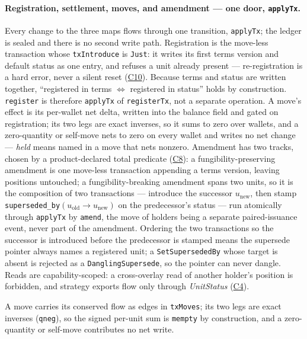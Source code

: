 \paragraph{Registration, settlement, moves, and amendment --- one door, \texttt{applyTx}.}
Every change to the three maps flows through one transition, \texttt{applyTx}; the ledger is
sealed and there is no second write path. Registration is the move-less transaction whose
\texttt{txIntroduce} is \texttt{Just}: it writes its first terms version and default status
as one entry, and refuses a unit already present --- re-registration is a hard error, never a
silent reset (\hyperref[cond:C10]{C10}). Because terms and status are written together,
``registered in terms $\iff$ registered in status'' holds by construction. \texttt{register}
is therefore \texttt{applyTx} of \texttt{registerTx}, not a separate operation. A move's
effect is its per-wallet net delta, written into the balance field and gated on registration;
its two legs are exact inverses, so it sums to zero over wallets, and a zero-quantity or
self-move nets to zero on every wallet and writes no net change --- \emph{held} means named in
a move that nets nonzero. Amendment has two tracks, chosen by a product-declared total
predicate (\hyperref[cond:C8]{C8}): a fungibility-preserving amendment is one move-less
transaction appending a terms version, leaving positions untouched; a fungibility-breaking
amendment spans two units, so it is the composition of two transactions --- introduce the
successor $u_{\mathrm{new}}$, then stamp
\texttt{superseded\_by}$(u_{\mathrm{old}}\!\to u_{\mathrm{new}})$ on the predecessor's status
--- run atomically through \texttt{applyTx} by \texttt{amend}, the move of holders being a
separate paired-issuance event, never part of the amendment. Ordering the two transactions so
the successor is introduced before the predecessor is stamped means the supersede pointer
always names a registered unit; a \texttt{SetSupersededBy} whose target is absent is rejected
as a \texttt{DanglingSupersede}, so the pointer can never dangle. Reads are capability-scoped: a
cross-overlay read of another holder's position is forbidden, and strategy exports flow only
through \emph{UnitStatus} (\hyperref[cond:C4]{C4}).

A move carries its conserved flow as edges in \texttt{txMoves}; its two legs are exact
inverses (\texttt{qneg}), so the signed per-unit sum is \texttt{mempty} by construction, and
a zero-quantity or self-move contributes no net write.

